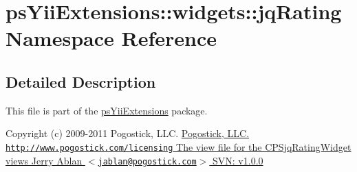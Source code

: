 \hypertarget{namespacepsYiiExtensions_1_1widgets_1_1jqRating}{
\section{psYiiExtensions::widgets::jqRating Namespace Reference}
\label{namespacepsYiiExtensions_1_1widgets_1_1jqRating}
}


\subsection{Detailed Description}
This file is part of the \hyperlink{namespacepsYiiExtensions}{psYiiExtensions} package.

Copyright (c) 2009-\/2011 Pogostick, LLC. \hyperlink{}{Pogostick, LLC.  \href{http://www.pogostick.com/licensing}{\tt http://www.pogostick.com/licensing} The view file for the CPSjqRatingWidget   views   Jerry Ablan $<$\href{mailto:jablan@pogostick.com}{\tt jablan@pogostick.com}$>$  SVN:   v1.0.0   }